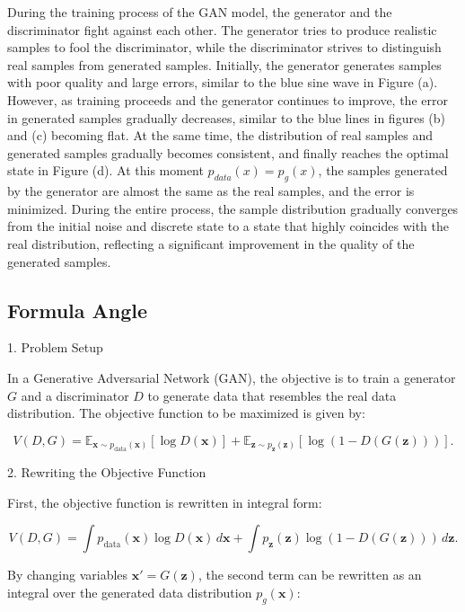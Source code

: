 During the training process of the GAN model, the generator and the discriminator fight against each other. 
The generator tries to produce realistic samples to fool the discriminator, while the discriminator strives 
to distinguish real samples from generated samples. Initially, the generator generates samples with poor 
quality and large errors, similar to the blue sine wave in Figure (a). However, as training proceeds and 
the generator continues to improve, the error in generated samples gradually decreases, similar to the 
blue lines in figures (b) and (c) becoming flat. At the same time, the distribution of real samples and 
generated samples gradually becomes consistent, and finally reaches the optimal state in Figure (d). At this moment $p_{data}(x) = p_g(x)$, 
the samples generated by the generator are almost the same as the real samples, and the error is minimized. 
During the entire process, the sample distribution gradually converges from the initial noise and discrete 
state to a state that highly coincides with the real distribution, reflecting a significant improvement in 
the quality of the generated samples.


\subsection*{Formula Angle}


1. Problem Setup

In a Generative Adversarial Network (GAN), the objective is to train a generator \( G \) and a discriminator \( D \) to generate data that resembles the real data distribution. The objective function to be maximized is given by:

\begin{equation}
    V(D, G) = \mathbb{E}_{\mathbf{x} \sim p_{\text{data}}(\mathbf{x})} [\log D(\mathbf{x})] + \mathbb{E}_{\mathbf{z} \sim p_{\mathbf{z}}(\mathbf{z})} [\log (1 - D(G(\mathbf{z})))].
\end{equation}

2. Rewriting the Objective Function

First, the objective function is rewritten in integral form:

\begin{equation}
    V(D, G) = \int p_{\text{data}}(\mathbf{x}) \log D(\mathbf{x}) \, d\mathbf{x} + \int p_{\mathbf{z}}(\mathbf{z}) \log (1 - D(G(\mathbf{z}))) \, d\mathbf{z}.
\end{equation}

By changing variables \(\mathbf{x}' = G(\mathbf{z})\), the second term can be rewritten as an integral over the generated data distribution \( p_g(\mathbf{x}) \):

